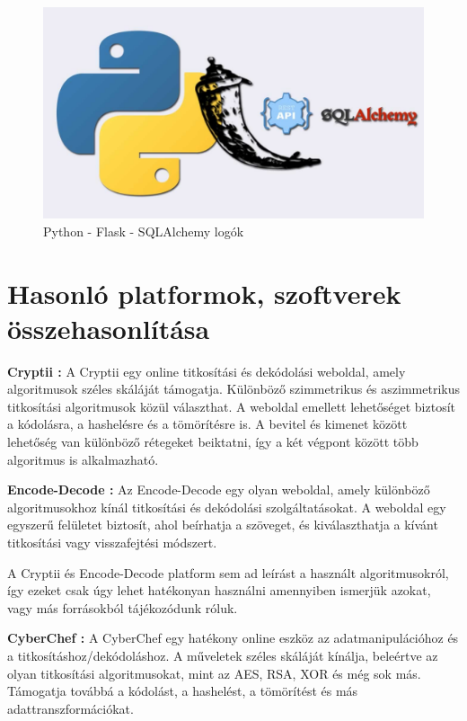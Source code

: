 \pagebreak
\begin{figure}[!h]
	\centering
	\includegraphics[scale=0.15]{images/logoPythonFlaskSqlalchemy}
	\caption{Python - Flask - SQLAlchemy logók}
	\label{fig:logosBack}
\end{figure}


\section {Hasonló platformok, szoftverek összehasonlítása}

\textbf{Cryptii \cite{Cryi}:} A Cryptii egy online titkosítási és dekódolási weboldal, amely algoritmusok széles skáláját támogatja. Különböző szimmetrikus és aszimmetrikus titkosítási algoritmusok közül választhat. A weboldal emellett lehetőséget biztosít a kódolásra, a hashelésre és a tömörítésre is. A bevitel és kimenet között lehetőség van különböző rétegeket beiktatni, így a két végpont között több algoritmus is alkalmazható.

\textbf{Encode-Decode \cite{EnDe}:} Az Encode-Decode egy olyan weboldal, amely különböző algoritmusokhoz kínál titkosítási és dekódolási szolgáltatásokat. A weboldal egy egyszerű felületet biztosít, ahol beírhatja a szöveget, és kiválaszthatja a kívánt titkosítási vagy visszafejtési módszert.

A Cryptii és Encode-Decode platform sem ad leírást a használt algoritmusokról, így ezeket csak úgy lehet hatékonyan használni amennyiben ismerjük azokat, vagy más forrásokból tájékozódunk róluk.

\vspace{10pt}
\textbf{CyberChef \cite{CyCh}:} A CyberChef egy hatékony online eszköz az adatmanipulációhoz és a titkosításhoz/dekódoláshoz. A műveletek széles skáláját kínálja, beleértve az olyan titkosítási algoritmusokat, mint az AES, RSA, XOR és még sok más. Támogatja továbbá a kódolást, a hashelést, a tömörítést és más adattranszformációkat.

